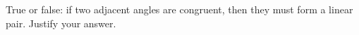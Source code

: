 True or false: if two adjacent angles are congruent, then they must form a linear pair. Justify your answer.
